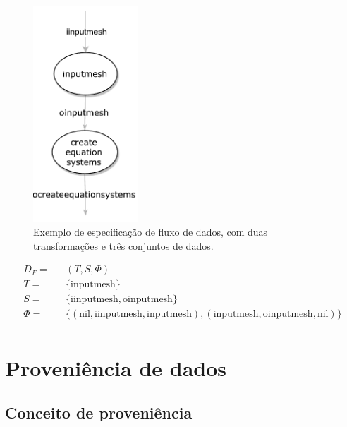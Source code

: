 \begin{figure}[ht]
    \centering
    \includegraphics[width=0.35\textwidth]{img/example-dataflow-specification}
    \caption[Exemplo de especificação de fluxo de dados]{Exemplo de especificação de fluxo de dados, com duas transformações e três conjuntos de dados.}%
    \label{fig:example-dataflow-specification}
\end{figure}


\[
\begin{aligned}
D_F = && (T, S, \Phi) \\
T = && \{ \textrm{inputmesh} \} \\
S = && \{ \textrm{iinputmesh}, \textrm{oinputmesh} \} \\
\Phi = && \{ (\textrm{nil}, \textrm{iinputmesh}, \textrm{inputmesh}),
(\textrm{inputmesh}, \textrm{oinputmesh}, \textrm{nil})
\} \\
\end{aligned}
\]


\section{Proveniência de dados}

\subsection{Conceito de proveniência}  %

